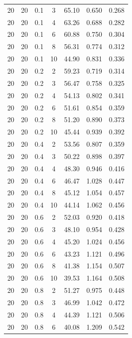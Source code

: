 \documentclass[11pt,a4paper]{article}
\begin{document}
\begin{longtable}{ccccccc}
        20 &  20  &  0.1  & 3 & 65.10 & 0.650 & 0.268 \\
        20 &  20  &  0.1  & 4 & 63.26 & 0.688 & 0.282 \\
        20 &  20  &  0.1  & 6 & 60.88 & 0.750 & 0.304 \\
        20 &  20  &  0.1  & 8 & 56.31 & 0.774 & 0.312 \\
        20 &  20  &  0.1  & 10 & 44.90 & 0.831 & 0.336 \\
        \midrule
        20 &  20  &  0.2  & 2 & 59.23 & 0.719 & 0.314 \\
        20 &  20  &  0.2  & 3 & 56.47 & 0.758 & 0.325 \\
        20 &  20  &  0.2  & 4 & 54.13 & 0.802 & 0.341 \\
        20 &  20  &  0.2  & 6 & 51.61 & 0.854 & 0.359 \\
        20 &  20  &  0.2  & 8 & 51.20 & 0.890 & 0.373 \\
        20 &  20  &  0.2  & 10 & 45.44 & 0.939 & 0.392 \\
        \midrule
        20 &  20  &  0.4  & 2 & 53.56 & 0.807 & 0.359 \\
        20 &  20  &  0.4  & 3 & 50.22 & 0.898 & 0.397 \\
        20 &  20  &  0.4  & 4 & 48.30 & 0.946 & 0.416 \\
        20 &  20  &  0.4  & 6 & 46.47 & 1.028 & 0.447 \\
        20 &  20  &  0.4  & 8 & 45.12 & 1.054 & 0.457 \\
        20 &  20  &  0.4  & 10 & 44.14 & 1.062 & 0.456 \\
        \midrule
        20 &  20  &  0.6  & 2 & 52.03 & 0.920 & 0.418 \\
        20 &  20  &  0.6  & 3 & 48.10 & 0.954 & 0.428 \\
        20 &  20  &  0.6  & 4 & 45.20 & 1.024 & 0.456 \\
        20 &  20  &  0.6  & 6 & 43.23 & 1.121 & 0.496 \\
        20 &  20  &  0.6  & 8 & 41.38 & 1.154 & 0.507 \\
        20 &  20  &  0.6  & 10 & 39.53 & 1.164 & 0.508 \\
        \midrule
        20 &  20  &  0.8  & 2 & 51.27 & 0.975 & 0.448 \\
        20 &  20  &  0.8  & 3 & 46.99 & 1.042 & 0.472 \\
        20 &  20  &  0.8  & 4 & 44.39 & 1.121 & 0.506 \\
        20 &  20  &  0.8  & 6 & 40.08 & 1.209 & 0.542 \\

\end{longtable}
\end{document}
